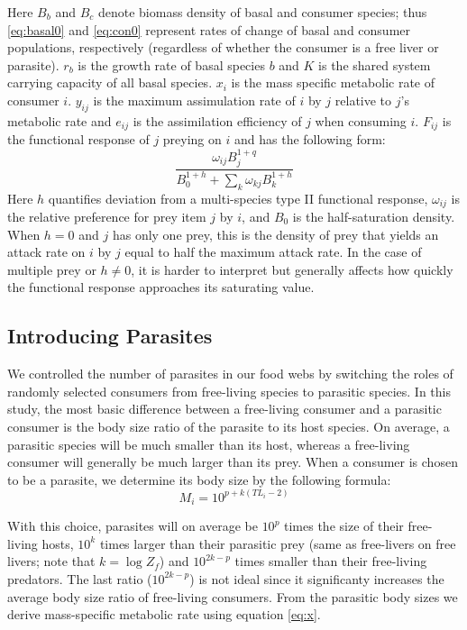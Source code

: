 \documentclass[11pt]{amsart}
\begin{document}
Here $B_b$ and $B_c$ denote biomass density of basal and consumer species; thus \eqref{eq:basal0} and \eqref{eq:con0} represent rates of change of basal and consumer populations, respectively (regardless of whether the consumer is a free liver or parasite).  $r_b$ is the growth rate of basal species $b$ and $K$ is the shared system carrying capacity of all basal species.  $x_i$ is the mass specific metabolic rate of consumer $i$. $y_{ij}$ is the maximum assimulation rate of $i$ by $j$ relative to $j$'s metabolic rate and $e_{ij}$ is the assimilation efficiency of $j$ when consuming $i$. $F_{ij}$ is the functional response of $j$ preying on $i$ and has the following form:
\begin{equation}
\frac{\omega_{ij}B_j^{1+q}}{B_0^{1+h} + \sum_k\omega_{kj}B_k^{1+h}}\label{eq:FR0}
\label{fr0}
\end{equation}
Here $h$ quantifies deviation from a multi-species type II functional response, $\omega_{ij}$ is the relative preference for prey item $j$ by $i$, and $B_0$ is the half-saturation density.  When $h=0$ and $j$ has only one prey, this is the density of prey that yields an attack rate on $i$ by $j$ equal to half the maximum attack rate.  In the case of multiple prey or $h\neq0$, it is harder to interpret but generally affects how quickly the functional response approaches its saturating value.  

\subsection{Introducing Parasites}

We controlled the number of parasites in our food webs by switching the roles of randomly selected consumers from free-living species to parasitic species.  In this study, the most basic difference between a free-living consumer and a parasitic consumer is the body size ratio of the parasite to its host species.  On average, a parasitic species will be much smaller than its host, whereas a free-living consumer will generally be much larger than its prey.  When a consumer is chosen to be a parasite, we determine its body size by the following formula:
\begin{equation}
M_i = 10^{p + k(TL_i -2)} \label{eq:Mpara}
\end{equation}

With this choice, parasites will on average be $10^{p}$ times the size of their free-living hosts, $10^k$ times larger than their parasitic prey (same as free-livers on free livers; note that $k = \log Z_f$) and $10^{2k-p}$ times smaller than their free-living predators.  The last ratio ($10^{2k-p}$) is not ideal since it significanty increases the average body size ratio of free-living consumers.  From the parasitic body sizes we derive mass-specific metabolic rate using equation \ref{eq:x}.
\end{document}
